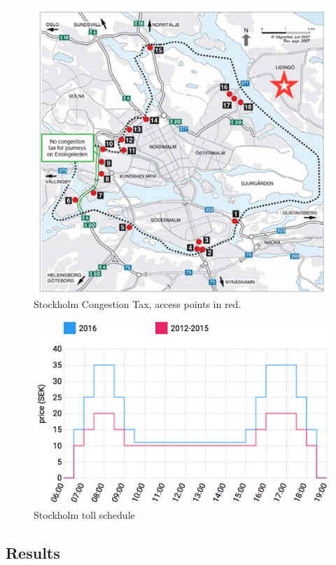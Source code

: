 \begin{figure}
    \includegraphics[width=5in]{../img/stockholm-map.png}
    \caption{Stockholm Congestion Tax, access points in red. \citep{transportstyrelsen2015}}
    \label{fig:stockholm-map}
\end{figure}

\begin{figure}
    \includegraphics[width=4.5in]{../img/stockholm-prices.png}
    \caption{Stockholm toll schedule }
    \label{fig:stockholm-prices}
\end{figure}

\subsection{Results}

